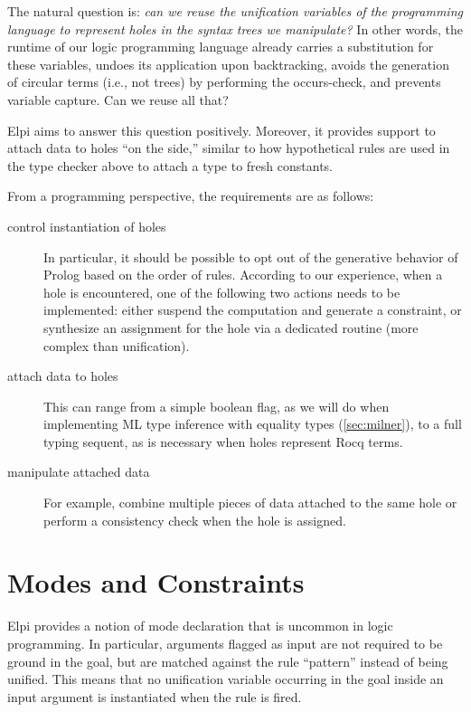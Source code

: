 \documentclass[a4paper, 11pt]{book}
\begin{document}
The natural question is: \emph{can we reuse the unification variables of the
programming language to represent holes in the syntax trees we manipulate?}
In other words, the runtime of our logic programming language already carries
a substitution for these variables, undoes its application upon
backtracking, avoids the generation of circular terms (i.e., not trees) by
performing the occurs-check, and prevents variable capture. Can we reuse all
that?

Elpi aims to answer this question positively. Moreover, it provides support
to attach data to holes ``on the side,'' similar to how hypothetical rules are
used in the type checker above to attach a type to fresh constants.

From a programming perspective, the requirements are as follows:

\begin{description}
  \item[control instantiation of holes] In particular, it should be possible
    to opt out of the generative behavior of Prolog based on the order of
    rules. According to our experience, when a hole is encountered, one of
    the following two actions needs to be implemented: either suspend the
    computation and generate a constraint, or synthesize an assignment for
    the hole via a dedicated routine (more complex than unification).
  \item[attach data to holes] This can range from a simple boolean flag, as
    we will do when implementing ML type inference with equality types
    (\cref{sec:milner}), to a full typing sequent, as is necessary when holes
    represent Rocq terms.

  \item[manipulate attached data] For example, combine multiple pieces of
    data attached to the same hole or perform a consistency check when the
    hole is assigned.
\end{description}


\section{Modes and Constraints}\label{sec:modes}


Elpi provides a notion of mode declaration that is uncommon in logic
programming. In particular, arguments flagged as input are not required to be
ground in the goal, but are matched against the rule ``pattern'' instead of
being unified. This means that no unification variable occurring in the goal
inside an input argument is instantiated when the rule is fired.
\end{document}
